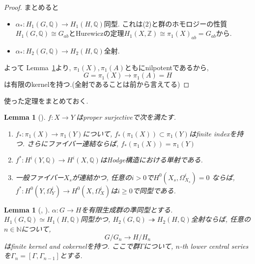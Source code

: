 \documentclass[dvipdfmx,a4paper,11pt]{article} %
\newtheorem{lem}[thm]{Lemma}
\theoremstyle{definition}
\theoremstyle{remark}
\numberwithin{equation}{section}
\newcommand{\Z}{\mathbb{Z}}
\newcommand{\N}{\mathbb{N}}
\begin{document}
\begin{proof}
まとめると
\begin{itemize}
\item  \( \alpha_* \colon H_1(G, \mathbb{Q}) \to H_1(H, \mathbb{Q}) \)同型. これは(2)と群のホモロジーの性質$H_1(G, \mathbb{Q}) \cong G_{ab}$とHurewiczの定理$H_1(X, \Z) \cong \pi_1(X)_{ab}=G_{ab}$から. 
\item   \( \alpha_* \colon H_2(G, \mathbb{Q}) \to H_2(H, \mathbb{Q}) \)全射. 
\end{itemize}
よって Lemma~\ref{lem-Voi-3.24}より, $\pi_1(X),  \pi_1(A)$ともにnilpotentであるから, 
\[G=\pi_1(X) \to \pi_1(A)=H
\]
は有限のkernelを持つ.(全射であることは前から言えてる)
\end{proof}

使った定理をまとめておく. 
\begin{lem}[{\cite[Lemma 1.2]{Voi}}]
\label{lem-Voi-1.2}
 \(  f \colon X \to Y \ \)はproper surjectiveで次を満たす. 
\begin{enumerate}
\item \( f_{*} \colon \pi_1(X) \to \pi_1(Y) \)について, $ f_{*}(\pi_1(X)) \subset \pi_1(Y)$はfinite indexを持つ. さらにファイバー連結ならば,  $f_{*}(\pi_1(X)) =  \pi_1(Y)$
\item  \( f^* \colon H^i(Y,\mathbb{Q}) \to H^i(X,\mathbb{Q}) \)はHodge構造における単射である. 
\item  一般ファイバー\( X_s \)が連結かつ, 任意の\( i>0 \)で\( H^0(X_s,\Omega^i_{X_s}) = 0 \)
ならば, \( f^* \colon H^0(Y,\Omega^i_Y) \to H^0(X,\Omega^i_X) \)は\( i \geq 0 \)で同型である. 
\end{enumerate}
\end{lem}

\begin{lem}[{\cite[Lemma 3.24]{Voi}, \cite[Proposition 6.2]{Wang22}}]
\label{lem-Voi-3.24}
\( \alpha \colon G \to H \)を有限生成群の準同型とする. 
\( H_1(G, \mathbb{Q}) \simeq H_1(H, \mathbb{Q}) \)同型かつ, 
\( H_2(G, \mathbb{Q}) \twoheadrightarrow  H_2(H, \mathbb{Q}) \)全射ならば, 
任意の\( n \in \N \)について,  
\[ G/G_n \to H/H_n \]
はfinite kernel and cokernelを持つ. 
ここで群$\Gamma$について, $n$-th lower central seriesを\( \Gamma_n = [\Gamma, \Gamma_{n-1}] \)とする. 
\end{lem}
\end{document}
